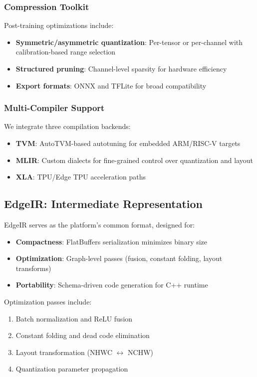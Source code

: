 \subsubsection{Compression Toolkit}
Post-training optimizations include:
\begin{itemize}
\item \textbf{Symmetric/asymmetric quantization}: Per-tensor or per-channel with calibration-based range selection
\item \textbf{Structured pruning}: Channel-level sparsity for hardware efficiency
\item \textbf{Export formats}: ONNX and TFLite for broad compatibility
\end{itemize}

\subsubsection{Multi-Compiler Support}
We integrate three compilation backends:
\begin{itemize}
\item \textbf{TVM}: AutoTVM-based autotuning for embedded ARM/RISC-V targets
\item \textbf{MLIR}: Custom dialects for fine-grained control over quantization and layout
\item \textbf{XLA}: TPU/Edge TPU acceleration paths
\end{itemize}

\subsection{EdgeIR: Intermediate Representation}

EdgeIR serves as the platform's common format, designed for:
\begin{itemize}
\item \textbf{Compactness}: FlatBuffers serialization minimizes binary size
\item \textbf{Optimization}: Graph-level passes (fusion, constant folding, layout transforms)
\item \textbf{Portability}: Schema-driven code generation for C++ runtime
\end{itemize}

Optimization passes include:
\begin{enumerate}
\item Batch normalization and ReLU fusion
\item Constant folding and dead code elimination
\item Layout transformation (NHWC $\leftrightarrow$ NCHW)
\item Quantization parameter propagation
\end{enumerate}

